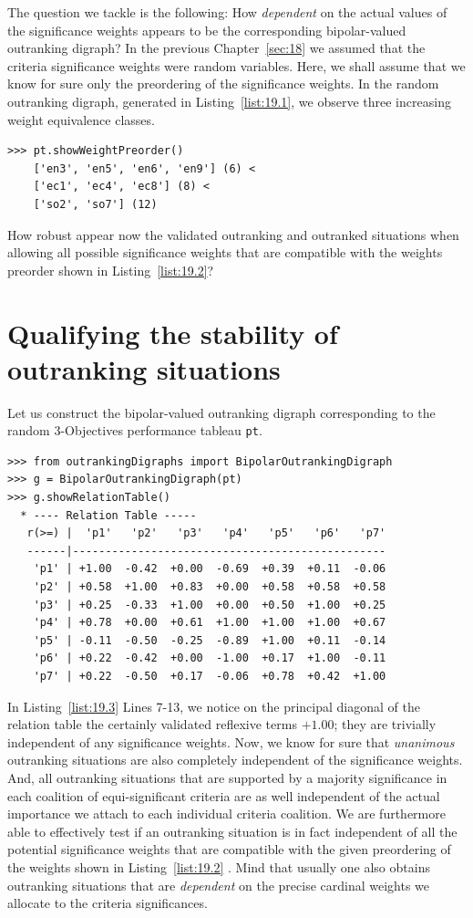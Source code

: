The question we tackle is the following: How \emph{dependent} on the actual values of the significance weights appears to be the corresponding bipolar-valued outranking digraph? In the previous Chapter~\ref{sec:18} we assumed that the criteria significance weights were random variables. Here, we shall assume that we know for sure only the preordering of the significance weights. In the random outranking digraph, generated in Listing~\vref{list:19.1}, we observe three increasing weight equivalence classes.
\begin{lstlisting}[caption={The significance weights preorder},label=list:19.2]
>>> pt.showWeightPreorder()
    ['en3', 'en5', 'en6', 'en9'] (6) <
    ['ec1', 'ec4', 'ec8'] (8) <
    ['so2', 'so7'] (12)
\end{lstlisting}
How robust appear now the validated outranking and outranked situations when allowing all possible significance weights that are compatible with the weights preorder shown in Listing~\vref{list:19.2}?

\section{Qualifying the stability of outranking situations}
\label{sec:19.2}

Let us construct the bipolar-valued outranking digraph corresponding to the random 3-Objectives performance tableau \texttt{pt}.
\begin{lstlisting}[caption={Example Bipolar Outranking Digraph},label=list:19.3]
>>> from outrankingDigraphs import BipolarOutrankingDigraph
>>> g = BipolarOutrankingDigraph(pt)
>>> g.showRelationTable()
  * ---- Relation Table -----
   r(>=) |  'p1'   'p2'   'p3'   'p4'   'p5'   'p6'   'p7'   
   ------|------------------------------------------------
    'p1' | +1.00  -0.42  +0.00  -0.69  +0.39  +0.11  -0.06  
    'p2' | +0.58  +1.00  +0.83  +0.00  +0.58  +0.58  +0.58  
    'p3' | +0.25  -0.33  +1.00  +0.00  +0.50  +1.00  +0.25  
    'p4' | +0.78  +0.00  +0.61  +1.00  +1.00  +1.00  +0.67  
    'p5' | -0.11  -0.50  -0.25  -0.89  +1.00  +0.11  -0.14  
    'p6' | +0.22  -0.42  +0.00  -1.00  +0.17  +1.00  -0.11  
    'p7' | +0.22  -0.50  +0.17  -0.06  +0.78  +0.42  +1.00  
\end{lstlisting}
In Listing~\vref{list:19.3} Lines 7-13, we notice on the principal diagonal of the relation table the certainly validated reflexive terms $+1.00$; they are trivially independent of any significance weights. Now, we know for sure that \emph{unanimous} outranking situations are also completely independent of the significance weights. And, all outranking situations that are supported by a majority significance in each coalition of equi-significant criteria are as well independent of the actual importance we attach to each individual criteria coalition. We are furthermore able to effectively test if an outranking situation is in fact independent of all the potential significance weights that are compatible with the given preordering of the weights shown in Listing~\vref{list:19.2} \citep{BIS-2014}. Mind that usually one also obtains outranking situations that are \emph{dependent} on the precise cardinal weights we allocate to the criteria significances.

